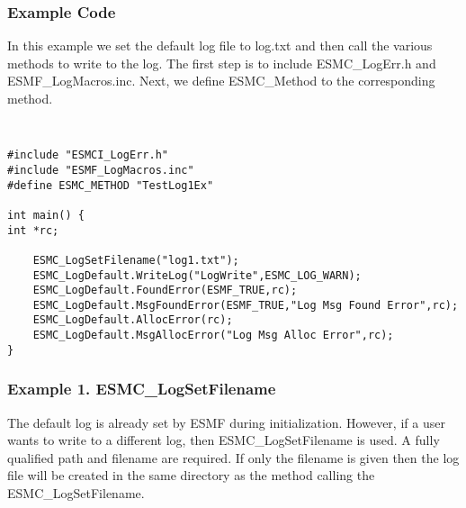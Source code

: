 %


\subsubsection{Example Code}

In this example we set the default log file to log.txt and then call the 
various methods to write to the log.  The first step is to include 
ESMC\_LogErr.h and ESMF\_LogMacros.inc.  Next, we define ESMC\_Method to 
the corresponding method.

{\tt
\begin{verbatim}
#include "ESMCI_LogErr.h"
#include "ESMF_LogMacros.inc"
#define ESMC_METHOD "TestLog1Ex"

int main() {
int *rc;
    
    ESMC_LogSetFilename("log1.txt");
    ESMC_LogDefault.WriteLog("LogWrite",ESMC_LOG_WARN);
    ESMC_LogDefault.FoundError(ESMF_TRUE,rc);
	ESMC_LogDefault.MsgFoundError(ESMF_TRUE,"Log Msg Found Error",rc);
    ESMC_LogDefault.AllocError(rc);
	ESMC_LogDefault.MsgAllocError("Log Msg Alloc Error",rc);
}
\end{verbatim}
\tt}

\subsubsection{Example 1. ESMC\_LogSetFilename}

The default log is already set by ESMF during initialization.  However, if a user
wants to write to a different log, then ESMC\_LogSetFilename is used.  A fully 
qualified path and filename are required.  If only the filename is given then
the log file will be created in the same directory as the method calling the
ESMC\_LogSetFilename.

